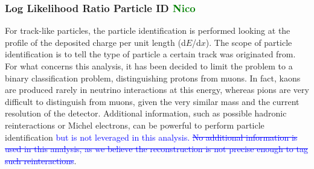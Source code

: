 \documentclass[a4paper]{article}
\begin{document}
\subsubsection{Log Likelihood Ratio Particle ID \textcolor{green}{Nico}}
\label{subsec:loglikelihoodpid}

For track-like particles, the particle identification is performed looking at the profile of the deposited charge per unit length (d$E$/d$x$).
The scope of particle identification is to tell the type of particle a certain track was originated from.
For what concerns this analysis, it has been decided to limit the problem to a binary classification problem, distinguishing protons from muons.
In fact, kaons are produced rarely in neutrino interactions at this energy, whereas pions are very difficult to distinguish from muons, given the very similar mass and the current resolution of the detector.
Additional information, such as possible hadronic reinteractions or Michel electrons, can be powerful to perform particle identification \textcolor{blue}{but is not leveraged in this analysis. \st{No additional information is used in this analysis, as we believe the reconstruction is not precise enough to tag such reinteractions}}.
\end{document}

